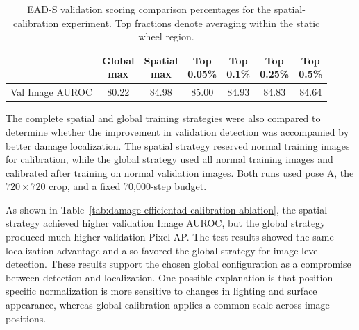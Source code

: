 \begin{table}[ht!]
    \centering
    \small
    \setlength{\tabcolsep}{4pt}
    \begin{tabular}{@{}l c c c c c c@{}}
        \toprule
                        & \shortstack{\textbf{Global}\\\textbf{max}} & \shortstack{\textbf{Spatial}\\\textbf{max}} & \shortstack{\textbf{Top}\\\textbf{0.05\%}} & \shortstack{\textbf{Top}\\\textbf{0.1\%}} & \shortstack{\textbf{Top}\\\textbf{0.25\%}} & \shortstack{\textbf{Top}\\\textbf{0.5\%}} \\
        \midrule
        \midrule
        Val Image AUROC & 80.22                                      & 84.98                                       & 85.00                                      & 84.93                                     & 84.83                                      & 84.64                                     \\
        \bottomrule
    \end{tabular}
    \vspace{5mm}
    \caption{EAD-S validation scoring comparison percentages for the spatial-calibration experiment. Top fractions denote averaging within the static wheel region.}
    \label{tab:damage-efficientad-score-ablation}
\end{table}

The complete spatial and global training strategies were also compared to determine whether the improvement in validation detection was accompanied by better damage localization. The spatial strategy reserved normal training images for calibration, while the global strategy used all normal training images and calibrated after training on normal validation images. Both runs used pose A, the \(720\times720\) crop, and a fixed 70,000-step budget.

As shown in Table~\ref{tab:damage-efficientad-calibration-ablation}, the spatial strategy achieved higher validation Image AUROC, but the global strategy produced much higher validation Pixel AP. The test results showed the same localization advantage and also favored the global strategy for image-level detection. These results support the chosen global configuration as a compromise between detection and localization. One possible explanation is that position specific normalization is more sensitive to changes in lighting and surface appearance, whereas global calibration applies a common scale across image positions.


